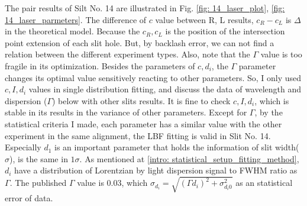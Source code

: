 \documentclass{article}
\begin{document}
The pair results of Silt No. 14 are illustrated in Fig. \ref{fig: 14_laser_plot}, \ref{fig: 14_laser_parmeters}.
The difference of $c$ value between R, L results, $c_R - c_L$ is $\Delta$ in the theoretical model.
Because the $c_R, c_L$ is the position of the intersection point extension of each slit hole.
But, by backlash error, we can not find a relation between the different experiment types.
Also, note that the $\Gamma$ value is too fragile in its optimization.
Besides the parameters of $c, d_i$, the $\Gamma$ parameter changes its optimal value sensitively reacting to other parameters.
So, I only used $c, I,d_i$ values in single distribution fitting, and discuss the data of wavelength and dispersion ($\Gamma$) below with other slits results.
It is fine to check $c, I,d_i$, which is stable in its results in the variance of other parameters.
Except for $\Gamma$, by the statistical criteria I made, each parameter has a similar value with the other experiment in the same alignment, the LBF fitting is valid in Slit No. 14.
Especially $d_1$ is an important parameter that holds the information of slit width($\sigma$), is the same in $1\sigma$.
As mentioned at \ref{intro: statistical_setup_fitting_method}, $d_i$ have a distribution of Lorentzian by light dispersion signal to FWHM ratio as $\Gamma$.
The published $\Gamma$ value is 0.03, which $\sigma_{d_i} = \sqrt{(\Gamma d_i)^2 + \sigma_{d_i0}^2}$ as an statistical error of data.
\end{document}
